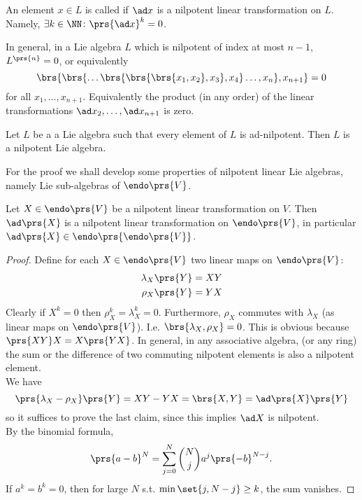 \documentclass[10pt,a4paper,twoside,openany,hidelinks]{book}
\begin{document}
\begin{definition}
An element $x \in L$ is called  if $\ad x$ is a nilpotent linear transformation on $L$.
Namely, $\exists k \in \NN \colon \prs{\ad x}^k = 0$.
\end{definition}
\begin{remark}
In general, in a Lie algebra $L$ which is nilpotent of index at most $n-1$, $L^{\prs{n}}=0$, or equivalently
\[\brs{\brs{\ldots\brs{\brs{\brs{x_1, x_2},x_3},x_4}\ldots,x_n},x_{n+1}} = 0\]
for all $x_1, \ldots, x_{n+1}$. Equivalently the product (in any order) of the linear transformations $\ad x_2, \ldots, \ad x_{n+1}$ is zero.
\end{remark}
\begin{theorem}[Engel]
Let $L$ be a a Lie algebra such that every element of $L$ is ad-nilpotent. Then $L$ is a nilpotent Lie algebra.
\end{theorem}
For the proof we shall develop some properties of nilpotent linear Lie algebras, namely Lie sub-algebras of $\endo\prs{V}$.\\
\begin{proposition}
Let $X \in \endo \prs{V}$ be a nilpotent linear transformation on $V$. Then $\ad\prs{X}$ is a nilpotent linear transformation on $\endo\prs{V}$, in particular $\ad\prs{X} \in \endo\prs{\endo\prs{V}}$.
\end{proposition}
\begin{proof}
Define for each $X \in \endo\prs{V}$ two linear maps on $\endo\prs{V}$:
\begin{align*}
\lambda_X\prs{Y} = XY \\
\rho_X\prs{Y} = YX
\end{align*}
Clearly if $X^k = 0$ then $\rho_X^k = \lambda_X^k = 0$.
Furthermore, $\rho_X$ commutes with $\lambda_X$ (as linear maps on $\endo\prs{V}$). I.e. $\brs{\lambda_X,\rho_X} = 0$. This is obvious because $\prs{XY}X = X\prs{YX}$.
In general, in any associative algebra, (or any ring) the sum or the difference of two commuting nilpotent elements is also a nilpotent element.\\
We have \[\prs{\lambda_X - \rho_X}\prs{Y} = XY - YX = \brs{X,Y} = \ad\prs{X}\prs{Y}\] so it suffices to prove the last claim, since this implies $\ad X$ is nilpotent.\\
By the binomial formula,
\[\prs{a-b}^N = \sum_{j=0}^N \binom{N}{j} a^j \prs{-b}^{N-j}\text{.}\]
If $a^k = b^k = 0$, then for large $N$ s.t. $\min\set{j,N-j} \geq k$, the sum vanishes.
\end{proof}
\end{document}
